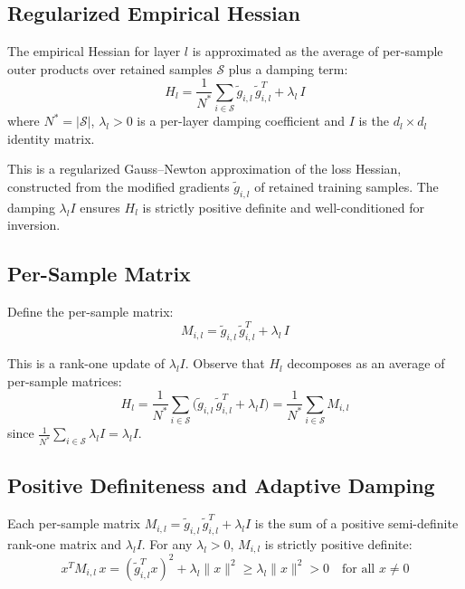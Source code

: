 \documentclass{article}
\begin{document}
\subsection{Regularized Empirical Hessian}

The empirical Hessian for layer $l$ is approximated as the average of per-sample outer products over retained samples $\mathcal{S}$ plus a damping term:
\begin{equation}\label{eq:hessian}
    H_l = \frac{1}{N^*}\sum_{i\in\mathcal{S}}\tilde{g}_{i,l}\,\tilde{g}_{i,l}^T + \lambda_l\,I
\end{equation}
where $N^* = |\mathcal{S}|$, $\lambda_l > 0$ is a per-layer damping coefficient and $I$ is the $d_l \times d_l$ identity matrix.

This is a regularized Gauss--Newton approximation of the loss Hessian, constructed from the modified gradients $\tilde{g}_{i,l}$ of retained training samples.
The damping $\lambda_l I$ ensures $H_l$ is strictly positive definite and well-conditioned for inversion.

\subsection{Per-Sample Matrix}\label{sec:per_sample_matrix}

Define the per-sample matrix:
\begin{equation}\label{eq:M_il}
    M_{i,l} = \tilde{g}_{i,l}\,\tilde{g}_{i,l}^T + \lambda_l\,I
\end{equation}

This is a rank-one update of $\lambda_l I$.
Observe that $H_l$ decomposes as an average of per-sample matrices:
\begin{equation}\label{eq:hessian_decomp}
    H_l
    = \frac{1}{N^*}\sum_{i\in\mathcal{S}}\bigl(\tilde{g}_{i,l}\,\tilde{g}_{i,l}^T + \lambda_l I\bigr)
    = \frac{1}{N^*}\sum_{i\in\mathcal{S}} M_{i,l}
\end{equation}
since $\frac{1}{N^*}\sum_{i\in\mathcal{S}} \lambda_l I = \lambda_l I$.

\subsection{Positive Definiteness and Adaptive Damping}

Each per-sample matrix $M_{i,l} = \tilde{g}_{i,l}\,\tilde{g}_{i,l}^T + \lambda_l I$ is the sum of a positive semi-definite rank-one matrix and $\lambda_l I$.
For any $\lambda_l > 0$, $M_{i,l}$ is strictly positive definite:
\begin{equation}
    x^T M_{i,l}\,x = (\tilde{g}_{i,l}^T x)^2 + \lambda_l\|x\|^2 \ge \lambda_l\|x\|^2 > 0
    \quad\text{for all } x \neq 0
\end{equation}
\end{document}

